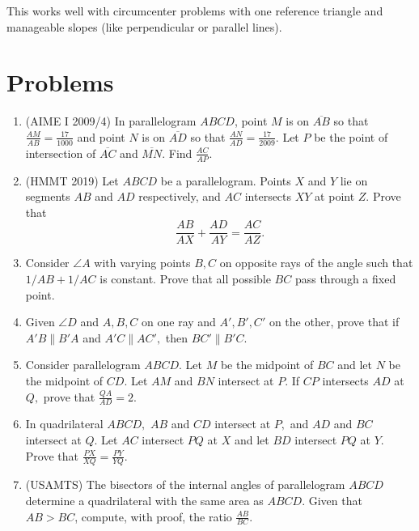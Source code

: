 \documentclass{article}
\begin{document}
This works well with circumcenter problems with one reference triangle and manageable slopes (like perpendicular or parallel lines).

\pagebreak

\section{Problems}


\begin{enumerate}
    \item (AIME I 2009/4) In parallelogram $ABCD$, point $M$ is on $\overline{AB}$ so that $\frac {AM}{AB} = \frac {17}{1000}$ and point $N$ is on $\overline{AD}$ so that $\frac {AN}{AD} = \frac {17}{2009}$. Let $P$ be the point of intersection of $\overline{AC}$ and $\overline{MN}$. Find $\frac {AC}{AP}$.

    \item (HMMT 2019) Let $ABCD$ be a parallelogram. Points $X$ and $Y$ lie on segments $AB$ and $AD$ respectively, and $AC$ intersects $XY$ at point $Z.$ Prove that
    $$\frac{AB}{AX}+\frac{AD}{AY}=\frac{AC}{AZ}.$$
    
    \item Consider $\angle A$ with varying points $B,C$ on opposite rays of the angle such that $1/AB+1/AC$ is constant. Prove that all possible $BC$ pass through a fixed point.
    
    \item Given $\angle D$ and $A,B,C$ on one ray and $A',B',C'$ on the other, prove that if $A'B\parallel B'A$ and $A'C\parallel AC',$ then $BC'\parallel B'C.$
    
    \item Consider parallelogram $ABCD.$ Let $M$ be the midpoint of $BC$ and let $N$ be the midpoint of $CD.$ Let $AM$ and $BN$ intersect at $P.$ If $CP$ intersects $AD$ at $Q,$ prove that $\frac{QA}{AD}=2.$
    
    \item In quadrilateral $ABCD,$ $AB$ and $CD$ intersect at $P,$ and $AD$ and $BC$ intersect at $Q.$ Let $AC$ intersect $PQ$ at $X$ and let $BD$ intersect $PQ$ at $Y.$ Prove that $\frac{PX}{XQ}=\frac{PY}{YQ}.$
    
    \item (USAMTS) The bisectors of the internal angles of parallelogram $ABCD$ determine a quadrilateral with the same area as $ABCD$. Given that $AB > BC$, compute, with proof, the ratio $\frac{AB}{BC}$.
    

\end{enumerate}
\end{document}
